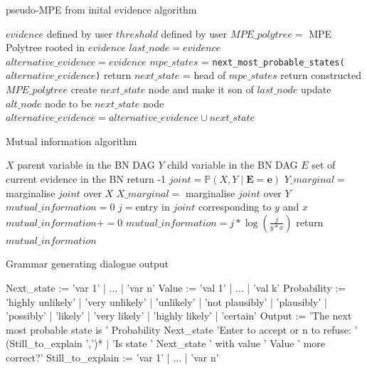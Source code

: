 \begin{algorithm}[htp!]
	\caption{pseudo-MPE from inital evidence algorithm}
	\label{alg:pseudo-mpe-initial-evidence}
	\begin{algorithmic}[1]
		\State $evidence$ defined by user
		\State $threshold$ defined by user
		\State $MPE\_polytree = $ MPE Polytree rooted in $evidence$
		\State $last\_node = evidence$
		\State $alternative\_evidence = evidence$ 
			\State $mpe\_states$ = \texttt{next\_most\_probable\_states($alternative\_evidence$)}
				\State return
			\Else
				\State $next\_state$ = head of $mpe\_states$ 
					\State return constructed $MPE\_polytree$
				\EndIf
				\State create $next\_state$ node and make it son of $last\_node$
				\State update $alt\_node$ node to be $next\_state$ node
				\State $alternative\_evidence = alternative\_evidence \cup next\_state$
			\EndIf
		\EndWhile
	\end{algorithmic}
\end{algorithm}

\begin{algorithm}[htp!]
	\caption{Mutual information algorithm}
	\label{alg:mutual-information}
	\begin{algorithmic}[1]
		\State $X$ parent variable in the BN DAG
		\State $Y$ child variable in the BN DAG
		\State $E$ set of current evidence in the BN
			\State return -1
		\EndIf
		\State $joint=\mathbb{P}(X,Y \mid \boldsymbol{E}=\boldsymbol{e})$
		\State $Y\_marginal=$ marginalise $joint$ over $X$
		\State $X\_marginal=$ marginalise $joint$ over $Y$
		\State $mutual\_information = 0$
				\State $j=$entry in $joint$ corresponding to $y$ and $x$
					\State $mutual\_information += 0$
				\Else
					\State $mutual\_information = j * \log( \frac{j}{y * x } )$
				\EndIf
			\EndFor
		\EndFor
		\State return $mutual\_information$
	\end{algorithmic}
\end{algorithm}

\begin{algorithm}[htp!]
	\caption{Grammar generating dialogue output}
	\label{alg:nl-dialogue}
	\begin{algorithmic}[1]
		\State Next\_state := 'var 1' | $\ldots$ |  'var n'
		\State Value := 'val 1' | $\ldots$ |  'val k'
		\State Probability := 'highly unlikely' | 'very unlikely' | 'unlikely' | 'not plausibly' | 'plausibly' | 'possibly' | 'likely' | 'very likely' | 'highly likely' | 'certain'
		\State Output := 'The next most probable state is ' Probability Next\_state 'Enter to accept or n to refuse: ' (Still\_to\_explain ',')* | 'Is state ' Next\_state ' with value ' Value ' more correct?' 
		\State Still\_to\_explain := 'var 1' | $\ldots$ |  'var n'
	\end{algorithmic}
\end{algorithm}

